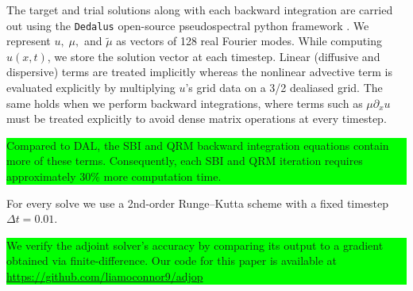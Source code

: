 \documentclass[%
 reprint,
 amsmath,amssymb,
 aps,
 pre,
]{revtex4-2}
\newcommand{\hly}[1]{\colorbox{lime}{\parbox{\columnwidth}{#1}}}
\newcommand\tmu{\tilde{\mu}}
\begin{document}
The target and trial solutions along with each backward integration are carried out using the \texttt{Dedalus} open-source pseudospectral python framework \cite{Burns2020}. 
We represent $u,\;\mu,$ and $\tmu$ as vectors of 128 real Fourier modes. 
While computing $u(x, t)$, we store the solution vector at each timestep.
Linear (diffusive and dispersive) terms are treated implicitly whereas the nonlinear advective term is evaluated explicitly by multiplying $u$'s grid data on a 3/2 dealiased grid. 
The same holds when we perform backward integrations, where terms such as $\mu\partial_x u$ must be treated explicitly to avoid dense matrix operations at every timestep.
\hly{Compared to DAL, the SBI and QRM backward integration equations contain more of these terms. 
Consequently, each SBI and QRM iteration requires approximately $30\%$ more computation time.}
For every solve we use a 2nd-order Runge--Kutta scheme with a fixed timestep $\Delta t=0.01$.
\hly{We verify the adjoint solver's accuracy by comparing its output to a gradient obtained via finite-difference.
Our code for this paper is available at \url{https://github.com/liamoconnor9/adjop}}
\end{document}
